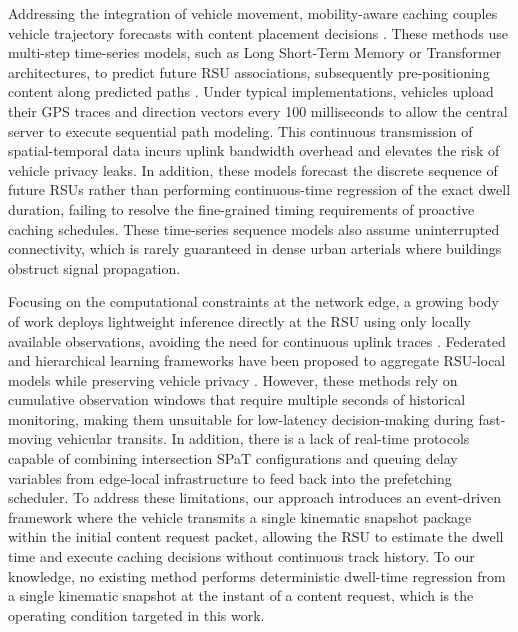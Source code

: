 \documentclass[journal]{IEEEtran}
\begin{document}
Addressing the integration of vehicle movement, mobility-aware caching couples vehicle trajectory forecasts with content placement decisions \cite{feng2023, wang2025, yu2024}. These methods use multi-step time-series models, such as Long Short-Term Memory or Transformer architectures, to predict future RSU associations, subsequently pre-positioning content along predicted paths \cite{cheng2025, nam2025}. Under typical implementations, vehicles upload their GPS traces and direction vectors every 100 milliseconds to allow the central server to execute sequential path modeling. This continuous transmission of spatial-temporal data incurs uplink bandwidth overhead and elevates the risk of vehicle privacy leaks. In addition, these models forecast the discrete sequence of future RSUs rather than performing continuous-time regression of the exact dwell duration, failing to resolve the fine-grained timing requirements of proactive caching schedules. These time-series sequence models also assume uninterrupted connectivity, which is rarely guaranteed in dense urban arterials where buildings obstruct signal propagation.

Focusing on the computational constraints at the network edge, a growing body of work deploys lightweight inference directly at the RSU using only locally available observations, avoiding the need for continuous uplink traces \cite{liu2024, yang2024, gopal2023}. Federated and hierarchical learning frameworks have been proposed to aggregate RSU-local models while preserving vehicle privacy \cite{hasan2024, zhang2024, xu2024}. However, these methods rely on cumulative observation windows that require multiple seconds of historical monitoring, making them unsuitable for low-latency decision-making during fast-moving vehicular transits. In addition, there is a lack of real-time protocols capable of combining intersection SPaT configurations and queuing delay variables from edge-local infrastructure to feed back into the prefetching scheduler. To address these limitations, our approach introduces an event-driven framework where the vehicle transmits a single kinematic snapshot package within the initial content request packet, allowing the RSU to estimate the dwell time and execute caching decisions without continuous track history. To our knowledge, no existing method performs deterministic dwell-time regression from a single kinematic snapshot at the instant of a content request, which is the operating condition targeted in this work.
\end{document}
